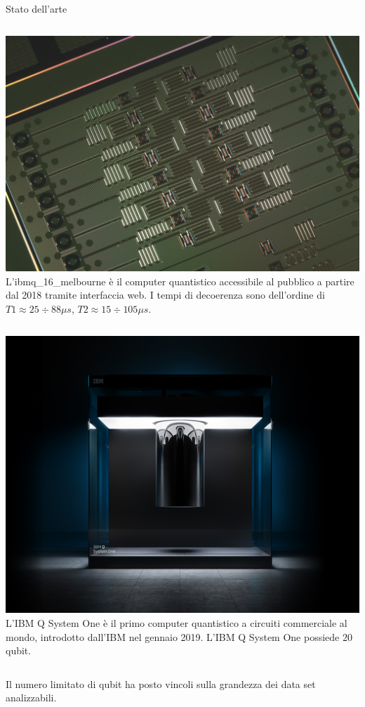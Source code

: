 \documentclass{beamer}
\begin{document}
    \begin{frame}{Stato dell'arte}
        \begin{columns}
            \includegraphics[width=\textwidth]{gfx/ibm_16}
            L'ibmq\_16\_melbourne è il computer quantistico accessibile al pubblico 
            a partire dal 2018 tramite interfaccia web. 
            I tempi di decoerenza sono dell'ordine di 
            $T1 \approx 25 \div 88 \mu s$, $T2 \approx 15 \div 105 \mu s$. 
        \end{columns}

        \begin{columns}
            \includegraphics[width=\textwidth]{gfx/ibm_q_system_one.png}
            L'IBM Q System One è il primo computer quantistico a circuiti commerciale al mondo, 
            introdotto dall'IBM nel gennaio 2019. L'IBM Q System One possiede 20 qubit. 
        \end{columns}

        \vspace{.5cm}
        Il numero limitato di qubit ha posto vincoli sulla grandezza dei data set analizzabili. 
    \end{frame}
\end{document}
